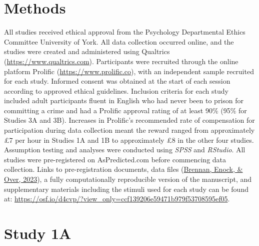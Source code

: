 \documentclass[
]{article}
\begin{document}
\hypertarget{methods}{%
\section{Methods}\label{methods}}

All studies received ethical approval from the Psychology Departmental Ethics Committee University of York. All data collection occurred online, and the studies were created and administered using Qualtrics (\url{https://www.qualtrics.com}). Participants were recruited through the online platform Prolific (\url{https://www.prolific.co}), with an independent sample recruited for each study. Informed consent was obtained at the start of each session according to approved ethical guidelines. Inclusion criteria for each study included adult participants fluent in English who had never been to prison for committing a crime and had a Prolific approval rating of at least 90\% (95\% for Studies 3A and 3B). Increases in Prolific's recommended rate of compensation for participation during data collection meant the reward ranged from approximately £7 per hour in Studies 1A and 1B to approximately £8 in the other four studies. Assumption testing and analyses were conducted using \emph{SPSS} and \emph{RStudio}. All studies were pre-registered on AsPredicted.com before commencing data collection. Links to pre-registration documents, data files (\protect\hyperlink{ref-Brennan2023}{Brennan, Enock, \& Over, 2023}), a fully computationally reproducible version of the manuscript, and supplementary materials including the stimuli used for each study can be found at: \url{https://osf.io/d4cvp/?view_only=ccf139206e59471b979f53708595ef05}.

\hypertarget{study-1a}{%
\section{Study 1A}\label{study-1a}}
\end{document}
